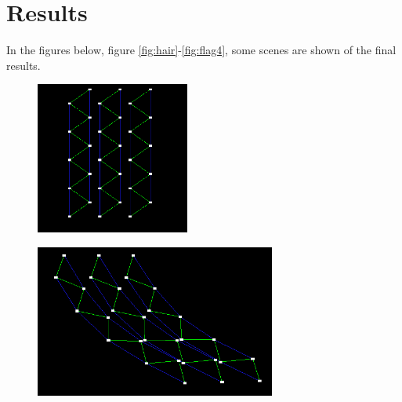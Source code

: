 \section{Results}
In the figures below, figure \ref{fig:hair}-\ref{fig:flag4}, some scenes are shown of the final results.

\begin{figure}[H]
\centering
\begin{minipage}[t]{.40\textwidth}
  \centering
  \includegraphics[height=5cm]{img/resulthair.png}
  \label{fig:hair}
\end{minipage}\hfill
\begin{minipage}[t]{.50\textwidth}
  \centering
  \includegraphics[height=5cm]{img/resulthair2.png}
  \label{fig:hair2}
\end{minipage}
\end{figure}

